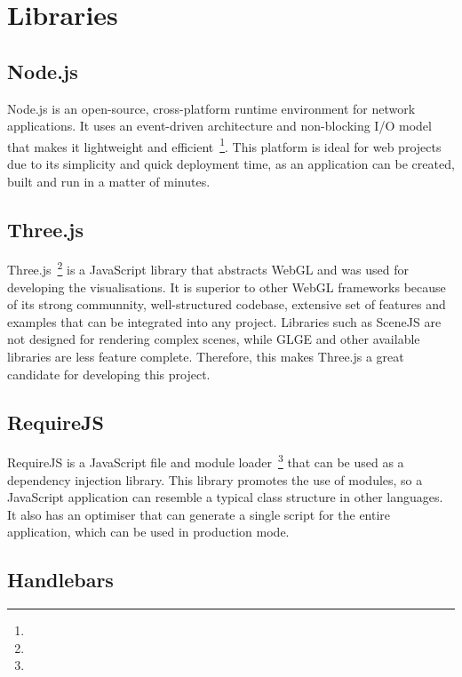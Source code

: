 \section{Libraries} {
\label{sec:libraries}
	
	\subsection{Node.js} {
	\label{sec:nodejs}
	
		Node.js is an open-source, cross-platform runtime environment for network applications. It uses an event-driven architecture and non-blocking I/O model that makes it lightweight and efficient~\footnote{}. This platform is ideal for web projects due to its simplicity and quick deployment time, as an application can be created, built and run in a matter of minutes.

	}

	\subsection{Three.js} {
	\label{sec:threejs}

		Three.js~\footnote{} is a JavaScript library that abstracts WebGL and was used for developing the visualisations. It is superior to other WebGL frameworks because of its strong communnity, well-structured codebase, extensive set of features and examples that can be integrated into any project. Libraries such as SceneJS are not designed for rendering complex scenes, while GLGE and other available libraries are less feature complete. Therefore, this makes Three.js a great candidate for developing this project.

	}

	\subsection{RequireJS} {
	\label{sec:requirejs}
		
		RequireJS is a JavaScript file and module loader~\footnote{} that can be used as a dependency injection library. This library promotes the use of modules, so a JavaScript application can resemble a typical class structure in other languages. It also has an optimiser that can generate a single script for the entire application, which can be used in production mode.

	}

	\subsection{Handlebars} {
	\label{sec:handlebars}

}}
